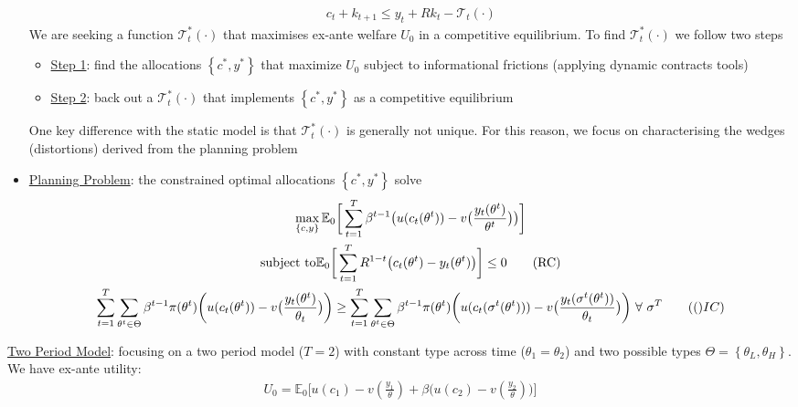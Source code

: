 \documentclass{article}
\begin{document}
\begin{itemize}
    \begin{gather*}
        c_{t} + k_{t+1} \leq y_{t} + Rk_{t} - \mathcal{T}_{t}(\cdot)
    \end{gather*}
    We are seeking a function $\mathcal{T}_{t}^{*}(\cdot)$ that maximises ex-ante welfare $U_{0}$ in a competitive equilibrium. To find $\mathcal{T}_{t}^{*}(\cdot)$ we follow two steps
    \begin{itemize}
        \item  \underline{Step 1}: find the allocations $\left\{ c^{*}, y^{*} \right\}$ that maximize $U_{0}$ subject to informational frictions (applying dynamic contracts tools)
        \item  \underline{Step 2}: back out a $\mathcal{T}_{t}^{*}(\cdot)$ that implements $\left\{ c^{*}, y^{*} \right\}$ as a competitive equilibrium
    \end{itemize}
    One key difference with the static model is that $\mathcal{T}_{t}^{*}(\cdot)$ is generally not unique. For this reason, we focus on characterising the wedges (distortions) derived from the planning problem
    \item  \underline{Planning Problem}: the constrained optimal allocations $\left\{ c^{*}, y^{*} \right\}$ solve
    \begin{gather*}
        \max_{\left\{ c, y \right\} } \mathbb{E}_{0} \bigg[\sum_{t=1}^{T} \beta^{t-1} \big(u(c_{t}(\theta^{t})) - v\big(\frac{y_{t}(\theta^{t})}{\theta^{t}} \big) \big) \bigg] \\
        \text{subject to}
        \mathbb{E}_{0} \bigg[\sum_{t=1}^{T} R^{1-t} \big(c_{t}(\theta^{t}) - y_{t}(\theta^{t}) \big) \bigg] \leq 0 \tag{RC} \\
        \sum_{t=1}^{T} \sum_{\theta^{t} \in \Theta} \beta^{t-1} \pi(\theta^{t}) \bigg(u(c_{t}(\theta^{t})) - v \big(\frac{y_{t}(\theta^{t})}{\theta_{t}} \big) \bigg) \geq \sum_{t=1}^{T} \sum_{\theta^{t} \in \Theta} \beta^{t-1} \pi(\theta^{t}) \bigg(u(c_{t}(\sigma^{t} (\theta^{t}))) - v \big(\frac{y_{t}(\sigma^{t}(\theta^{t}))}{\theta_{t}} \big) \bigg) \ \forall \ \sigma^{T} \tag(IC)
    \end{gather*}
\end{itemize}
\vspace{2.5mm}
\par \underline{Two Period Model}: focusing on a two period model ($T = 2$) with constant type across time ($\theta_{1} = \theta_{2}$) and two possible types $\Theta = \left\{ \theta_{L}, \theta_{H} \right\}$. We have ex-ante utility:
\begin{gather*}
    U_{0} = \mathbb{E}_{0}\bigg[u(c_{1}) - v(\frac{y_{1}}{\theta}) + \beta \big(u(c_{2}) - v(\frac{y_{2}}{\theta}) \big) \bigg]
\end{gather*}
\end{document}
